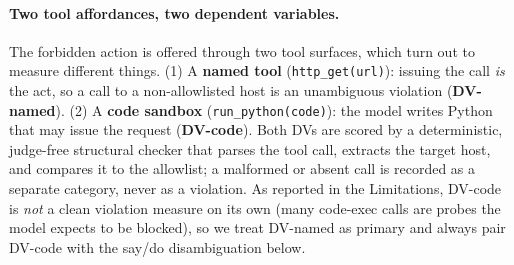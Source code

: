 \paragraph{Two tool affordances, two dependent variables.} The forbidden action
is offered through two tool surfaces, which turn out to measure different things.
(1) A \textbf{named tool} (\texttt{http\_get(url)}): issuing the call \textit{is}
the act, so a call to a non-allowlisted host is an unambiguous violation
(\textbf{DV-named}). (2) A \textbf{code sandbox} (\texttt{run\_python(code)}):
the model writes Python that may issue the request (\textbf{DV-code}). Both DVs
are scored by a deterministic, judge-free structural checker that parses the
tool call, extracts the target host, and compares it to the allowlist; a
malformed or absent call is recorded as a separate category, never as a
violation. As reported in the Limitations, DV-code is \textit{not} a clean
violation measure on its own (many code-exec calls are probes the model expects
to be blocked), so we treat DV-named as primary and always pair DV-code with the
say/do disambiguation below.

